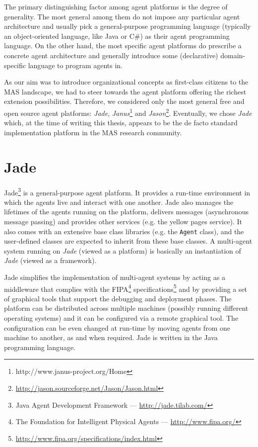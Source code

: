 The primary distinguishing factor among agent platforms is the degree of generality.
The most general among them do not impose any particular agent architecture and usually pick a general-purpose programming language (typically an object-oriented language, like Java or C\#) as their agent programming language.
On the other hand, the most specific agent platforms do prescribe a concrete agent architecture and generally introduce some (declarative) domain-specific language to program agents in.

As our aim was to introduce organizational concepts as first-class citizens to the MAS landscape, we had to steer towards the agent platform offering the richest extension possibilities.
Therefore, we considered only the most general free and open source agent platforms: \textit{Jade}, \textit{Janus}\footnote{http://www.janus-project.org/Home} and \textit{Jason}\footnote{\url{http://jason.sourceforge.net/Jason/Jason.html}}.
Eventually, we chose \textit{Jade} which, at the time of writing this thesis, appears to be the de facto standard implementation platform in the MAS research community.

\section{Jade}

Jade\footnote{Java Agent Development Framework --- \url{http://jade.tilab.com/}} is a general-purpose agent platform.
It provides a run-time environment in which the agents live and interact with one another.
Jade also manages the lifetimes of the agents running on the platform, delivers messages (asynchronous message passing) and provides other services (e.g. the yellow pages service).
It also comes with an extensive base class libraries (e.g. the \texttt{Agent} class), and the user-defined classes are expected to inherit from these base classes.
A multi-agent system running on \textit{Jade} (viewed as a platform) is basically an instantiation of \textit{Jade} (viewed as a framework).

Jade simplifies the implementation of multi-agent systems by acting as a middleware that complies with the FIPA\footnote{The Foundation for Intelligent Physical Agents --- \url{http://www.fipa.org/}}
specifications\footnote{\url{http://www.fipa.org/specifications/index.html}} and by providing a set of graphical tools that support the debugging and deployment phases.
The platform can be distributed across multiple machines (possibly running different operating systems) and it can be configured via a remote graphical tool.
The configuration can be even changed at run-time by moving agents from one machine to another, as and when required.
Jade is written in the Java programming language.

